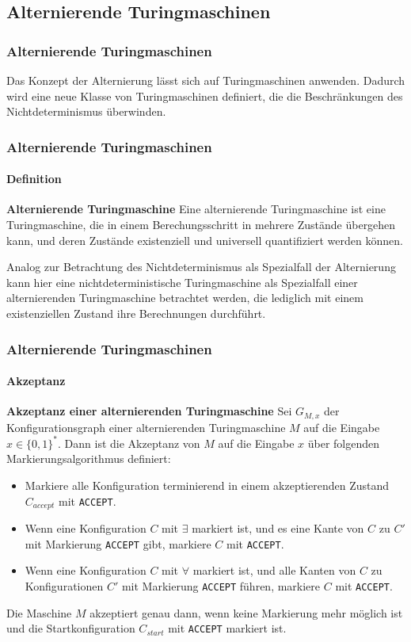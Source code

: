 \subsection{Alternierende Turingmaschinen}
\begin{frame}
    \frametitle{Alternierende Turingmaschinen}
    Das Konzept der Alternierung lässt sich auf Turingmaschinen anwenden. 
    Dadurch wird eine neue Klasse von Turingmaschinen definiert, die die Beschränkungen des
    Nichtdeterminismus überwinden.
\end{frame}

\begin{frame}
    \frametitle{Alternierende Turingmaschinen}
    \framesubtitle{Definition}
    \begin{block}{\textbf{Alternierende Turingmaschine}}
        Eine alternierende Turingmaschine ist eine Turingmaschine, die in einem Berechungsschritt in mehrere Zustände übergehen kann,
        und deren Zustände existenziell und universell quantifiziert werden können.
    \end{block}
    Analog zur Betrachtung des Nichtdeterminismus als Spezialfall der Alternierung kann hier eine nichtdeterministische Turingmaschine als Spezialfall einer alternierenden
    Turingmaschine betrachtet werden, die lediglich mit einem existenziellen Zustand ihre Berechnungen durchführt.

\end{frame}

\begin{frame}
    \frametitle{Alternierende Turingmaschinen}
    \framesubtitle{Akzeptanz}
    \begin{block}{\textbf{Akzeptanz einer alternierenden Turingmaschine}}
        Sei $G_{M,x}$ der Konfigurationsgraph einer alternierenden Turingmaschine $M$ auf die Eingabe $x \in \{0, 1\}^*$.
        Dann ist die Akzeptanz von $M$ auf die Eingabe $x$ über folgenden Markierungsalgorithmus definiert:
        \begin{itemize}
            \item Markiere alle Konfiguration terminierend in einem akzeptierenden Zustand $C_{accept}$ mit \texttt{ACCEPT}.
            \item Wenn eine Konfiguration $C$ mit $\exists$ markiert ist, und es eine Kante von $C$ zu $C'$ mit
            Markierung \texttt{ACCEPT} gibt, markiere $C$ mit \texttt{ACCEPT}.
            \item Wenn eine Konfiguration $C$ mit $\forall$ markiert ist, und alle Kanten von $C$ zu
            Konfigurationen $C'$ mit Markierung \texttt{ACCEPT} führen, markiere $C$ mit \texttt{ACCEPT}.
        \end{itemize}
        Die Maschine $M$ akzeptiert genau dann, wenn keine Markierung mehr möglich ist und die Startkonfiguration $C_{start}$ mit \texttt{ACCEPT}
        markiert ist.
    \end{block}

\end{frame}

